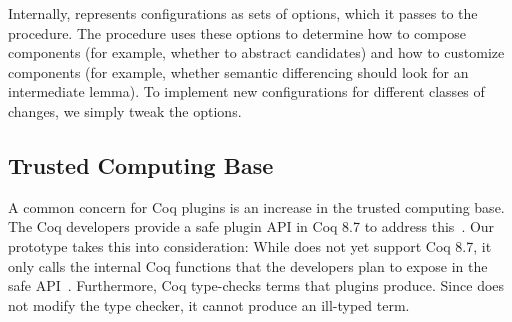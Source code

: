 
Internally, \sysname represents configurations as sets of options,
which it passes to the procedure. The procedure uses these options to determine
how to compose components (for example, whether to abstract candidates) 
and how to customize components (for example, whether semantic differencing should look for an intermediate lemma).
To implement new configurations for different classes of changes, we simply tweak the options.






\subsection{Trusted Computing Base}
\label{sec:tcb}

A common concern for Coq plugins is an increase in the trusted computing base.
The Coq developers provide a safe plugin API in Coq 8.7 to address this~\cite{coq87news}.
Our prototype takes this into consideration:
While \sysname does not yet support Coq 8.7, it only calls the internal Coq functions that the 
developers plan to expose in the safe API~\cite{coqPR}.
Furthermore, Coq type-checks terms that plugins produce.
Since \sysname does not modify the type checker, it cannot produce an ill-typed term.

